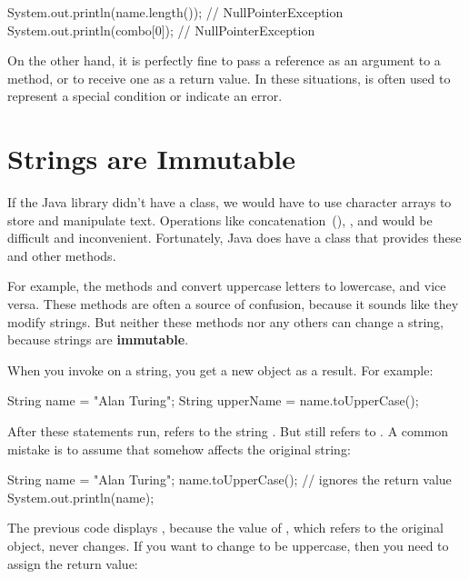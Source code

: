 \begin{code}
System.out.println(name.length());  // NullPointerException
System.out.println(combo[0]);       // NullPointerException
\end{code}

On the other hand, it is perfectly fine to pass a  reference as an argument to a method, or to receive one as a return value.
In these situations,  is often used to represent a special condition or indicate an error.


\section{Strings are Immutable}

If the Java library didn't have a  class, we would have to use character arrays to store and manipulate text.
Operations like concatenation~(\java{+}), , and  would be difficult and inconvenient.
Fortunately, Java does have a  class that provides these and other methods.


For example, the methods  and  convert uppercase letters to lowercase, and vice versa.
These methods are often a source of confusion, because it sounds like they modify strings.
But neither these methods nor any others can change a string, because strings are {\bf immutable}.

When you invoke  on a string, you get a new  object as a result.
For example:

\begin{code}
String name = "Alan Turing";
String upperName = name.toUpperCase();
\end{code}


After these statements run,  refers to the string .
But  still refers to .
A common mistake is to assume that  somehow affects the original string:

\begin{code}
String name = "Alan Turing";
name.toUpperCase();           // ignores the return value
System.out.println(name);
\end{code}

The previous code displays , because the value of , which refers to the original  object, never changes.
If you want to change  to be uppercase, then you need to assign the return value:

